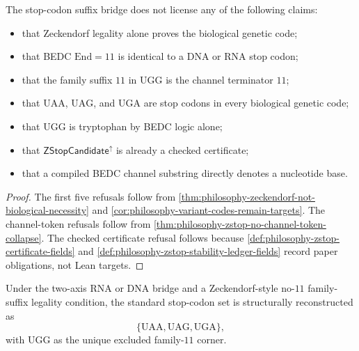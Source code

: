 \begin{theorem}
\label{thm:philosophy-zstop-cannot-claim-boundary}
The stop-codon suffix bridge does not license any of the following
claims:
\begin{itemize}
  \item that Zeckendorf legality alone proves the biological genetic
    code;
  \item that BEDC $\mathrm{End}=11$ is identical to a DNA or RNA stop
    codon;
  \item that the family suffix $11$ in $\mathrm{UGG}$ is the channel
    terminator $11$;
  \item that $\mathrm{UAA}$, $\mathrm{UAG}$, and $\mathrm{UGA}$ are stop
    codons in every biological genetic code;
  \item that $\mathrm{UGG}$ is tryptophan by BEDC logic alone;
  \item that $\mathsf{ZStopCandidate}^{\uparrow}$ is already a checked
    certificate;
  \item that a compiled BEDC channel substring directly denotes a
    nucleotide base.
\end{itemize}
\end{theorem}
\begin{proof}
The first five refusals follow from
\autoref{thm:philosophy-zeckendorf-not-biological-necessity} and
\autoref{cor:philosophy-variant-codes-remain-targets}. The channel-token
refusals follow from
\autoref{thm:philosophy-zstop-no-channel-token-collapse}. The checked
certificate refusal follows because
\autoref{def:philosophy-zstop-certificate-fields} and
\autoref{def:philosophy-zstop-stability-ledger-fields} record paper
obligations, not Lean targets.
\end{proof}

\begin{corollary}
\label{cor:philosophy-zstop-allowed-claim}
Under the two-axis RNA or DNA bridge and a Zeckendorf-style no-$11$
family-suffix legality condition, the standard stop-codon set is
structurally reconstructed as
$$
  \{\mathrm{UAA},\mathrm{UAG},\mathrm{UGA}\},
$$
with $\mathrm{UGG}$ as the unique excluded family-$11$ corner.
\end{corollary}

